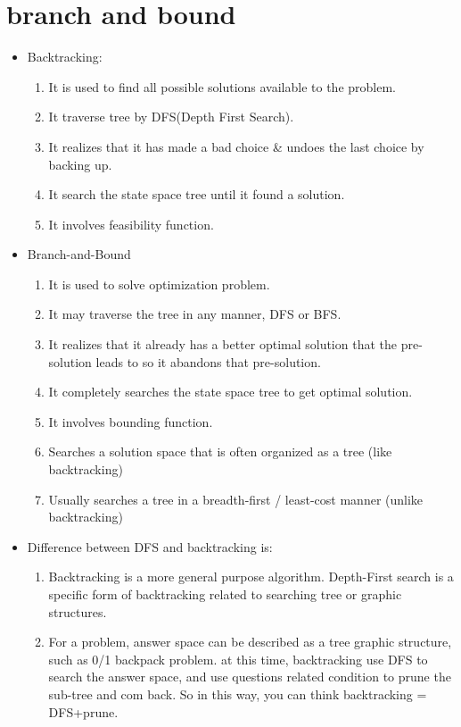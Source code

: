 \documentclass[a4paper,11pt,twoside]{book}
\begin{document}
\section{branch and bound}
\begin{itemize}
\item Backtracking:
\begin{enumerate}
\item It is used to find all possible solutions available to the problem.
\item It traverse tree by DFS(Depth First Search).
\item It realizes that it has made a bad choice \& undoes the last choice by backing up.
\item It search the state space tree until it found a solution.
\item It involves feasibility function.
\end{enumerate}


\item Branch-and-Bound
\begin{enumerate}
\item It is used to solve optimization problem.
\item It may traverse the tree in any manner, DFS or BFS.
\item It realizes that it already has a better optimal solution that the pre-solution leads to so it abandons that pre-solution.
\item It completely searches the state space tree to get optimal solution.
\item It involves bounding function.

\item Searches a solution space that is often organized as a tree (like backtracking)
\item Usually searches a tree in a breadth-first / least-cost manner (unlike backtracking)

\end{enumerate}

\item Difference between DFS and backtracking is:
\begin{enumerate}
\item Backtracking is a more general purpose algorithm. Depth-First search is a specific form of backtracking related to searching tree or graphic structures.  
\item For a problem, answer space can be described as a tree graphic structure, such as 0/1 backpack problem. at this time, backtracking use DFS to search the answer space, and use questions related condition to prune the sub-tree and com back. So in this way, you can think backtracking = DFS+prune. 


\end{enumerate}
\end{itemize}
\end{document}
